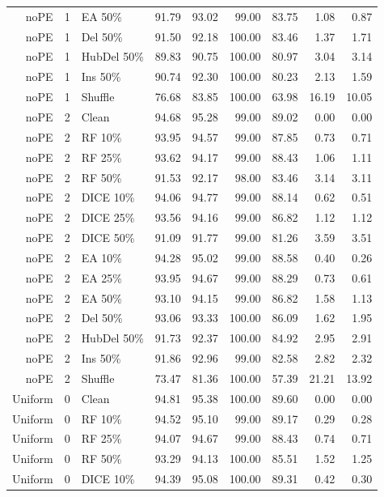 {\begin{longtable}{rllrrrrrr}
noPE & 1 & EA 50\% & 91.79 & 93.02 & 99.00 & 83.75 & 1.08 & 0.87 \\
noPE & 1 & Del 50\% & 91.50 & 92.18 & 100.00 & 83.46 & 1.37 & 1.71 \\
noPE & 1 & HubDel 50\% & 89.83 & 90.75 & 100.00 & 80.97 & 3.04 & 3.14 \\
noPE & 1 & Ins 50\% & 90.74 & 92.30 & 100.00 & 80.23 & 2.13 & 1.59 \\
noPE & 1 & Shuffle & 76.68 & 83.85 & 100.00 & 63.98 & 16.19 & 10.05 \\
noPE & 2 & Clean & 94.68 & 95.28 & 99.00 & 89.02 & 0.00 & 0.00 \\
noPE & 2 & RF 10\% & 93.95 & 94.57 & 99.00 & 87.85 & 0.73 & 0.71 \\
noPE & 2 & RF 25\% & 93.62 & 94.17 & 99.00 & 88.43 & 1.06 & 1.11 \\
noPE & 2 & RF 50\% & 91.53 & 92.17 & 98.00 & 83.46 & 3.14 & 3.11 \\
noPE & 2 & DICE 10\% & 94.06 & 94.77 & 99.00 & 88.14 & 0.62 & 0.51 \\
noPE & 2 & DICE 25\% & 93.56 & 94.16 & 99.00 & 86.82 & 1.12 & 1.12 \\
noPE & 2 & DICE 50\% & 91.09 & 91.77 & 99.00 & 81.26 & 3.59 & 3.51 \\
noPE & 2 & EA 10\% & 94.28 & 95.02 & 99.00 & 88.58 & 0.40 & 0.26 \\
noPE & 2 & EA 25\% & 93.95 & 94.67 & 99.00 & 88.29 & 0.73 & 0.61 \\
noPE & 2 & EA 50\% & 93.10 & 94.15 & 99.00 & 86.82 & 1.58 & 1.13 \\
noPE & 2 & Del 50\% & 93.06 & 93.33 & 100.00 & 86.09 & 1.62 & 1.95 \\
noPE & 2 & HubDel 50\% & 91.73 & 92.37 & 100.00 & 84.92 & 2.95 & 2.91 \\
noPE & 2 & Ins 50\% & 91.86 & 92.96 & 99.00 & 82.58 & 2.82 & 2.32 \\
noPE & 2 & Shuffle & 73.47 & 81.36 & 100.00 & 57.39 & 21.21 & 13.92 \\
Uniform & 0 & Clean & 94.81 & 95.38 & 100.00 & 89.60 & 0.00 & 0.00 \\
Uniform & 0 & RF 10\% & 94.52 & 95.10 & 99.00 & 89.17 & 0.29 & 0.28 \\
Uniform & 0 & RF 25\% & 94.07 & 94.67 & 99.00 & 88.43 & 0.74 & 0.71 \\
Uniform & 0 & RF 50\% & 93.29 & 94.13 & 100.00 & 85.51 & 1.52 & 1.25 \\
Uniform & 0 & DICE 10\% & 94.39 & 95.08 & 100.00 & 89.31 & 0.42 & 0.30 \\

\end{longtable}}
